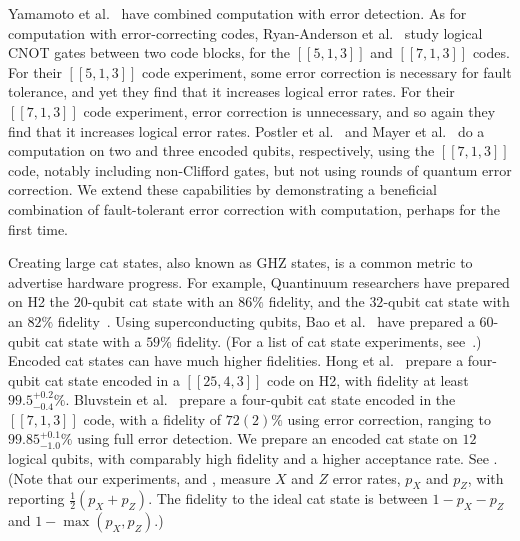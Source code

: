 \documentclass[10pt, twocolumn, aps, nofootinbib, longbibliography, nobibnotes, superscriptaddress]{revtex4-1} %
\begin{document}
Yamamoto et al.~\cite{Yamamoto23phaseestimattionerrordetection} have combined computation with error detection.  
As for computation with error-correcting codes, Ryan-Anderson et al.~\cite{quantinuum22h1} study logical CNOT gates between two code blocks, for the $[[5,1,3]]$ and $[[7,1,3]]$ codes.  For their $[[5,1,3]]$ code experiment, some error correction is necessary for fault tolerance, and yet they find that it increases logical error rates.  For their $[[7,1,3]]$ code experiment, error correction is unnecessary, and so again they find that it increases logical error rates.  
Postler et al.~\cite{Postler21universal} and Mayer et al.~\cite{Mayer24steaneftexperiment} do a computation on two and three encoded qubits, respectively, using the $[[7,1,3]]$ code, notably including non-Clifford gates, %
but not using rounds of quantum error correction.  
%
We extend these capabilities by demonstrating a beneficial {combination} of fault-tolerant error correction with computation, perhaps for the first time.  

Creating large cat states, also known as GHZ states, is a common metric to advertise hardware progress.  For example, Quantinuum researchers have prepared on H2 the $20$-qubit cat state with an $86\%$ fidelity, and the $32$-qubit cat state with an $82\%$ fidelity~\cite{Moses23quantinuum}.  Using superconducting qubits, Bao et al.~\cite{Bao24catstate60} have prepared a $60$-qubit cat state with a $59\%$ fidelity.  (For a list of cat state experiments, see~\cite{Krenn24catstates}.)  
Encoded cat states can have much higher fidelities.  
Hong et al.~\cite{Hong24cat4onh2} prepare a four-qubit cat state encoded in a $[[25,4,3]]$ code on H2, with fidelity at least $99.5^{+0.2}_{-0.4}\%$.  %
Bluvstein et al.~\cite{BluvsteinHarvard23neutralatoms} prepare a four-qubit cat state encoded in the $[[7,1,3]]$ code, with a fidelity of $72(2)\%$ using error correction, ranging to $99.85^{+0.1}_{-1.0}\%$ using full error detection.  We prepare an encoded cat state on $12$ logical qubits, with comparably high fidelity and a higher acceptance rate.  See .  %
(Note that our experiments, and \cite{Hong24cat4onh2}, measure $X$ and $Z$ error rates, $p_X$ and $p_Z$, with  reporting $\tfrac12(p_X + p_Z)$.  The fidelity to the ideal cat state is between $1 - p_X - p_Z$ and $1 - \max (p_X, p_Z)$.)  
\end{document}
